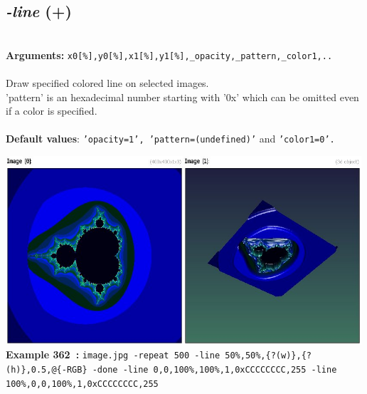 \documentclass[a4paper,11pt,twoside]{book}
\begin{document}
\subsection{\emph{-line} (+)}\vspace*{-0.5em}
~\\\textbf{Arguments: } 
{\small \texttt{x0[\%],y0[\%],x1[\%],y1[\%],\_opacity,\_pattern,\_color1,..}}\\~\\
Draw specified colored line on selected images.
~\\'pattern' is an hexadecimal number starting with '0x' which can be omitted
even if a color is specified.
~\\~\\\textbf{Default values}: {\small \texttt{'opacity=1', 'pattern=(undefined)'} and \texttt{'color1=0'.}}
\begin{center}\includegraphics[keepaspectratio=true,height=7cm,width=\textwidth]{img/gmic_def362.jpg}\\
{\footnotesize \textbf{Example 362~:} \texttt{image.jpg -repeat 500 -line 50\%,50\%,\{?(w)\},\{?(h)\},0.5,@\{-RGB\} -done -line 0,0,100\%,100\%,1,0xCCCCCCCC,255 -line 100\%,0,0,100\%,1,0xCCCCCCCC,255}}
\end{center}
\end{document}
